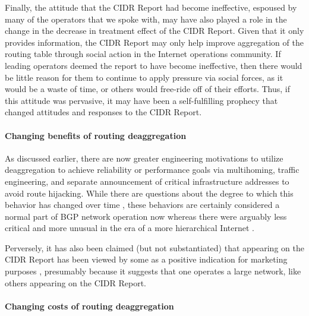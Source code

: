 Finally, the attitude that the CIDR Report had become ineffective, espoused by
many of the operators that we spoke with, may have also played a role in the
change in the decrease in treatment effect of the CIDR Report. Given that it
only provides information, the CIDR Report may only help improve aggregation of
the routing table through social action in the Internet operations community.
If leading operators deemed the report to have become ineffective, then there
would be little reason for them to continue to apply pressure via social
forces, as it would be a waste of time, or others would free-ride off of their
efforts. Thus, if this attitude was pervasive, it may have been a
self-fulfilling prophecy that changed attitudes and responses to the CIDR
Report.


\paragraph{Changing benefits of routing deaggregation}

As discussed earlier, there are now greater engineering motivations to utilize
deaggregation to achieve reliability or performance goals via multihoming,
traffic engineering, and separate announcement of critical infrastructure
addresses to avoid route hijacking. While there are questions about the degree
to which this behavior has changed over time \cite{Cittadini:2010pi}, these
behaviors are certainly considered a normal part of BGP network operation now
whereas there were arguably less critical and more unusual in the era of a more
hierarchical Internet \cite{Labovitz:2010zr}.

Perversely, it has also been claimed (but not substantiated) that appearing on
the CIDR Report has been viewed by some as a positive indication for marketing
purposes \cite{Smith:2006vn}, presumably because it suggests that one operates
a large network, like others appearing on the CIDR Report.

\paragraph{Changing costs of routing deaggregation}

